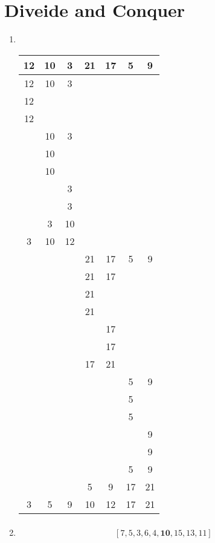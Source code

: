 \documentclass[sectionformat = exercise]{gadsescript}
\begin{document}
\section{Diveide and Conquer}
\begin{enumerate}[label=\alph*)]
	\item ~\\
		\begin{tabular}{| c | c | c | c | c | c | c |}
			\hline
			12	&10	&3	&21	&17	&5	&9\\\hline
			12	&10	&3	&~	&~	&~	&~\\\hline
			12	&~	&~	&~	&~	&~	&~\\\hline
			12	&~	&~	&~	&~	&~	&~\\\hline
			~	&10	&3	&~	&~	&~	&~\\\hline
			~	&10	&~	&~	&~	&~	&~\\\hline
			~	&10	&~	&~	&~	&~	&~\\\hline
			~	&~	&3	&~	&~	&~	&~\\\hline
			~	&~	&3	&~	&~	&~	&~\\\hline
			~	&3	&10	&~	&~	&~	&~\\\hline
			3	&10	&12	&~	&~	&~	&~\\\hline
			~	&~	&~	&21	&17	&5	&9\\\hline
			~	&~	&~	&21	&17	&~	&~\\\hline
			~	&~	&~	&21	&~	&~	&~\\\hline
			~	&~	&~	&21	&~	&~	&~\\\hline
			~	&~	&~	&~	&17	&~	&~\\\hline
			~	&~	&~	&~	&17	&~	&~\\\hline
			~	&~	&~	&17	&21	&~	&~\\\hline
			~	&~	&~	&~	&~	&5	&9\\\hline
			~	&~	&~	&~	&~	&5	&~\\\hline
			~	&~	&~	&~	&~	&5	&~\\\hline
			~	&~	&~	&~	&~	&~	&9\\\hline
			~	&~	&~	&~	&~	&~	&9\\\hline
			~	&~	&~	&~	&~	&5	&9\\\hline
			~	&~	&~	&5	&9	&17	&21\\\hline
			3	&5	&9	&10	&12	&17	&21\\\hline
		\end{tabular}
	\item
		\begin{multline*}
			[{\color{violet}10}, 7, 5, 15, 13, 3, 6, 11, 4]\\
			[7, 5, 3, 6, 4, \mathbf{10}, 15, 13, 11]\\

\end{multline*}
\end{enumerate}
\end{document}
